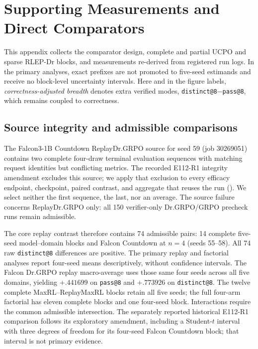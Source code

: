 \documentclass{article}
\newcommand{\1}{\mathbf 1}
\theoremstyle{remark}
\theoremstyle{definition}
\theoremstyle{plain}
\begin{document}
\section{Supporting Measurements and Direct Comparators}
\label{app:supporting}

This appendix collects the comparator design, complete and partial UCPO and
sparse RLEP-Dr blocks, and measurements re-derived from
registered run logs. In the primary analyses, exact prefixes are not promoted
to five-seed estimands and receive no block-level uncertainty intervals. Here and in the figure
labels, \emph{correctness-adjusted breadth} denotes extra verified modes,
\texttt{distinct@8}$-$\texttt{pass@8}, which remains coupled to correctness.

\subsection{Source integrity and admissible comparisons}
\label{app:source-integrity}

The Falcon3-1B Countdown ReplayDr.GRPO source for seed 59 (job 30269051)
contains two complete four-draw terminal evaluation sequences with matching
request identities but conflicting metrics. The recorded E112-R1 integrity
amendment excludes this source; we apply that exclusion to every efficacy
endpoint, checkpoint, paired contrast, and aggregate that reuses the run
().
We select neither the first sequence, the last, nor an average. The source
failure concerns ReplayDr.GRPO only: all 150 verifier-only Dr.GRPO/GRPO
precheck runs remain admissible.

The core replay contrast therefore contains 74 admissible pairs: 14 complete
five-seed model--domain blocks and Falcon Countdown at $n=4$ (seeds 55--58).
All 74 raw \texttt{distinct@8} differences are positive. The primary replay
and factorial analyses report four-seed means descriptively, without
confidence intervals. The Falcon
Dr.GRPO replay macro-average uses those same four seeds across all five
domains, yielding $+.441699$ on \texttt{pass@8} and $+.773926$ on
\texttt{distinct@8}. The twelve complete MaxRL--ReplayMaxRL blocks retain all
five seeds; the full four-arm factorial has eleven complete blocks and one
four-seed block. Interactions require the common admissible intersection. The separately
reported historical E112-R1 comparison follows its exploratory amendment,
including a Student-$t$ interval with three degrees of freedom for its
four-seed Falcon Countdown block; that interval is not primary evidence.
\end{document}
